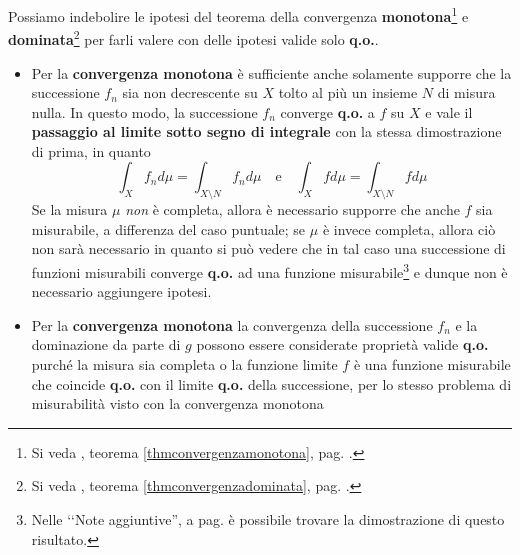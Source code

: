 \begin{observe}\label{indebolimentoteoremi}
	Possiamo indebolire le ipotesi del teorema della convergenza \textbf{monotona}\footnote{Si veda , teorema \ref{thmconvergenzamonotona}, pag. \pageref{thmconvergenzamonotona}.} e \textbf{dominata}\footnote{Si veda , teorema \ref{thmconvergenzadominata}, pag. \pageref{thmconvergenzadominata}.} per farli valere con delle ipotesi valide solo \textbf{q.o.}.
	\begin{itemize}
		\item Per la \textbf{convergenza monotona} è sufficiente anche solamente supporre che la successione $f_n$ sia non decrescente su $X$ tolto al più un insieme $N$ di misura nulla. In questo modo, la successione $f_n$ converge \textbf{q.o.} a $f$ su $X$ e vale il \textbf{passaggio al limite sotto segno di integrale} con la stessa dimostrazione di prima, in quanto
		\begin{equation*}
			\int_X f_nd\mu=\int_{X\setminus N}f_nd\mu\quad \text{e} \quad \int_X fd\mu=\int_{X\setminus N}fd\mu
		\end{equation*}
		Se la misura $\mu$ \textit{non} è completa, allora è necessario supporre che anche $f$ sia misurabile, a differenza del caso puntuale; se $\mu$ è invece completa, allora ciò non sarà necessario in quanto si può vedere che in tal caso una successione di funzioni misurabili converge \textbf{q.o.} ad una funzione misurabile\footnote{Nelle ‘‘Note aggiuntive'', a pag. \pageref{funzionimisurabiliqo} è possibile trovare la dimostrazione di questo risultato.} e dunque non è necessario aggiungere ipotesi.
		\item Per la \textbf{convergenza monotona} la convergenza della successione $f_n$ e la dominazione da parte di $g$ possono essere considerate proprietà valide \textbf{q.o.} purché la misura sia completa o la funzione limite $f$ è una funzione misurabile che coincide \textbf{q.o.} con il limite \textbf{q.o.} della successione, per lo stesso problema di misurabilità visto con la convergenza monotona  
	\end{itemize}
\end{observe}

